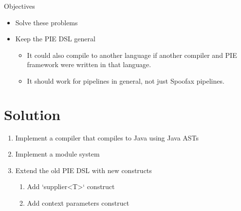 Objectives
\begin{itemize}
  \item Solve these problems
  \item Keep the PIE DSL general
  \begin{itemize}
    \item It could also compile to another language if another compiler and PIE framework were written in that language.
    \item It should work for pipelines in general, not just Spoofax pipelines.
  \end{itemize}
\end{itemize}

\section{\label{sec:introduction__solution}Solution}
\begin{enumerate}
  \item Implement a compiler that compiles to Java using Java ASTs
  \item Implement a module system
  \item Extend the old PIE DSL with new constructs
  \begin{enumerate}
    \item Add `supplier<T>` construct
    \item Add context parameters construct
  \end{enumerate}
\end{enumerate}
